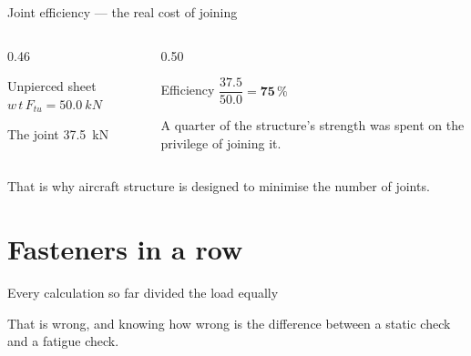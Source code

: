 \documentclass[aspectratio=169,10pt]{beamer}
\begin{document}
\begin{frame}{Joint efficiency --- the real cost of joining}
\begin{columns}[T]
\begin{column}{0.46\textwidth}
\begin{block}{Unpierced sheet}
$w\,t\,F_{tu} = \SI{50.0}{kN}$
\end{block}
\begin{block}{The joint}
\SI{37.5}{kN}
\end{block}
\end{column}
\begin{column}{0.50\textwidth}
\begin{alertblock}{Efficiency}
\centering\Large $\dfrac{37.5}{50.0}=\mathbf{75\,\%}$
\end{alertblock}
\vspace{2pt}
{\footnotesize A quarter of the structure's strength was spent on the privilege of joining it.}
\end{column}
\end{columns}
\vfill
\centering
\large That is why aircraft structure is designed to \alert{minimise the number of joints}.
\end{frame}

\section{Fasteners in a row}

\begin{frame}{Every calculation so far divided the load equally}
\centering
\resizebox{!}{4.6cm}{}
\vfill
\raggedright
\alert{That is wrong}, and knowing how wrong is the difference between a static check and a fatigue
check.
\end{frame}
\end{document}
